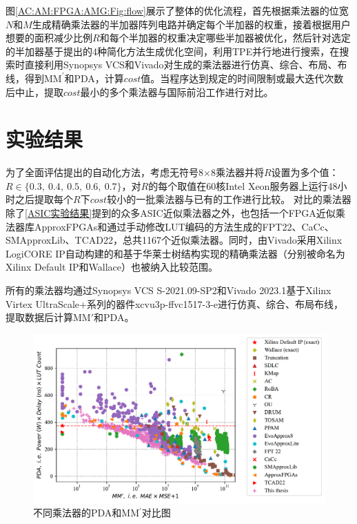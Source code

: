 图\ref{AC:AM:FPGA:AMG:Fig:flow}展示了整体的优化流程，首先根据乘法器的位宽$N$和$M$生成精确乘法器的半加器阵列电路并确定每个半加器的权重，接着根据用户想要的面积减少比例$R$和每个半加器的权重决定哪些半加器被优化，然后针对选定的半加器基于提出的4种简化方法生成优化空间，利用TPE并行地进行搜索，在搜索时直接利用Synopsys VCS和Vivado对生成的乘法器进行仿真、综合、布局、布线，得到$\text{MM}^{\prime}$和PDA，计算$cost$值。当程序达到规定的时间限制或最大迭代次数后中止，提取$cost$最小的多个乘法器与国际前沿工作进行对比。

\section{实验结果}

为了全面评估提出的自动化方法，考虑无符号8$\times$8乘法器并将$R$设置为多个值：$R \in \{ 0.3,\ 0.4,\ 0.5,\ 0.6,\ 0.7 \}$，对$R$的每个取值在60核Intel Xeon服务器上运行48小时之后提取每个$R$下$cost$较小的一批乘法器与已有的工作进行比较。
对比的乘法器除了\ref{ASIC实验结果}提到的众多ASIC近似乘法器之外，也包括一个FPGA近似乘法器库ApproxFPGAs\cite{AC:AM:FPGA:ApproxFPGAs}和通过手动修改LUT编码的方法生成的FPT22\cite{AC:AM:FPGA:FPT22}、CaCc\cite{AC:AM:FPGA:CaCc}、SMApproxLib\cite{AC:AM:FPGA:SMApproxLib}、TCAD22\cite{AC:AM:FPGA:TCAD22}，总共1167个近似乘法器。同时，由Vivado采用Xilinx LogiCORE IP\cite{IP:LogiCORE}自动构建的和基于华莱士树结构实现的精确乘法器（分别被命名为Xilinx Default IP和Wallace）也被纳入比较范围。

所有的乘法器均通过Synopsys VCS S-2021.09-SP2和Vivado 2023.1基于Xilinx Virtex UltraScale+系列的器件xcvu3p-ffvc1517-3-e进行仿真、综合、布局布线，提取数据后计算MM$\prime$和PDA。

\begin{figure}[!htbp]
    \centering
    \includegraphics[width=\linewidth]{./figs/AC-AM-FPGA-AMG-PDA_MM_prime.pdf}
    \caption{不同乘法器的PDA和MM$^{\prime}$对比图}
    \label{AC:AM:FPGA:AMG:Fig:PDA_MM_prime}
\end{figure}

